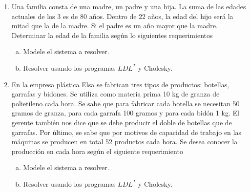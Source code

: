 \documentclass[
	spanish,
	8pt,
	utf8,
	xcolor=table,
	handout,
	aspectratio=169,
	professionalfonts,
	notheorems,
	mathserif,
]{beamer}
\newcounter{savedenum}
\newcommand*{\resume}{\setcounter{enumi}{\thesavedenum}}
\begin{document}
\begin{frame}
	\begin{enumerate}
		\resume

		\item

		      Una familia consta de una madre, un padre y una hija.
		      La suma de las edades actuales de los 3 es de 80 años.
		      Dentro de 22 años, la edad del hijo será la mitad que la de la madre.
		      Si el padre es un año mayor que la madre.
		      Determinar la edad de la familia según lo siguientes requerimientos

		      \begin{multicols}{2}

			      \begin{enumerate}[a)]
				      \item

				            Modele el sistema a resolver.

				      \item

				            Resolver usando los programas $LDL^{T}$ y Cholesky.
			      \end{enumerate}
		      \end{multicols}

		\item

		      En la empresa plástica Elsa se fabrican tres tipos de
		      productos: botellas, garrafas y bidones.
		      Se utiliza como materia prima 10 kg de granza de
		      polietileno cada hora.
		      Se sabe que para fabricar cada botella se necesitan 50
		      gramos de granza, para cada garrafa 100 gramos y para cada
		      bidón 1 kg.
		      El gerente también nos dice que se debe producir el doble
		      de botellas que de garrafas.
		      Por último, se sabe que por motivos de capacidad de trabajo
		      en las máquinas se producen en total 52 productos cada hora.
		      Se desea conocer la producción en cada hora según el
		      siguiente requerimiento

		      \begin{multicols}{2}

			      \begin{enumerate}[a)]
				      \item

				            Modele el sistema a resolver.

				      \item

				            Resolver usando los programas $LDL^{T}$ y Cholesky.
			      \end{enumerate}
		      \end{multicols}


\end{enumerate}
\end{frame}
\end{document}
